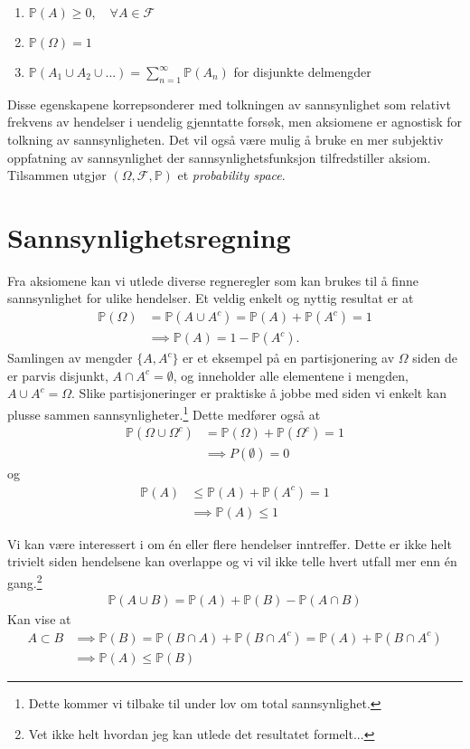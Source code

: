 \begin{enumerate}
\item $\mathbb{P}(A) \geq 0, \quad \forall A \in \mathscr{F}$
\item $\mathbb{P}(\Omega)=1$
\item $\mathbb{P}(A_1\cup A_2\cup...) = \sum_{n=1}^{\infty}\mathbb{P}( A_n)$ for disjunkte delmengder
\end{enumerate}
Disse egenskapene korrepsonderer med tolkningen av sannsynlighet som relativt frekvens av hendelser i uendelig gjenntatte forsøk, men aksiomene er agnostisk for tolkning av sannsynligheten. Det vil også være mulig å bruke en mer subjektiv oppfatning av sannsynlighet der sannsynlighetsfunksjon tilfredstiller aksiom. Tilsammen utgjør $(\Omega,\mathscr{F},\mathbb{P})$ et \textit{probability space}. 
\section{Sannsynlighetsregning}
Fra aksiomene kan vi utlede diverse regneregler som kan brukes til å finne sannsynlighet for ulike hendelser. Et veldig enkelt og nyttig resultat er at
\begin{align}
\mathbb{P}(\Omega) &= \mathbb{P}(A\cup A^c) = \mathbb{P}(A)+\mathbb{P}(A^c) = 1 \\
& \implies \mathbb{P}(A) = 1 - \mathbb{P}(A^c).
\end{align}
Samlingen av mengder $\{A,A^c\}$ er et eksempel på en partisjonering av $\Omega$ siden de er parvis disjunkt, $A \cap A^c = \emptyset$, og inneholder alle elementene i mengden, $A \cup A^c = \Omega$. Slike partisjoneringer er praktiske å jobbe med siden vi enkelt kan plusse sammen sannsynligheter.\footnote{Dette kommer vi tilbake til under lov om total sannsynlighet.} Dette medfører også at
\begin{align}
\mathbb{P}(\Omega \cup \Omega^c) &= \mathbb{P}(\Omega)+\mathbb{P}(\Omega^c)=1 \\
&\implies P(\emptyset)=0
\end{align}
og
\begin{align}
\mathbb{P}(A) &\leq \mathbb{P}(A)+\mathbb{P}(A^c) = 1 \\
&\implies \mathbb{P}(A) \leq 1
\end{align}

Vi kan være interessert i om én eller flere hendelser inntreffer. Dette er ikke helt trivielt siden hendelsene kan overlappe og vi vil ikke telle hvert utfall mer enn én gang.\footnote{Vet ikke helt hvordan jeg kan utlede det resultatet formelt...}
\begin{align}
\mathbb{P}(A\cup B) = \mathbb{P}(A)+\mathbb{P}(B)-\mathbb{P}(A\cap B)
\end{align}
Kan vise at
\begin{align}
A \subset B &\implies \mathbb{P}(B) = \mathbb{P}(B\cap A)+\mathbb{P}(B\cap A^c) = \mathbb{P}(A)+\mathbb{P}(B\cap A^c) \\
&\implies \mathbb{P}(A) \leq \mathbb{P}(B)
\end{align}
